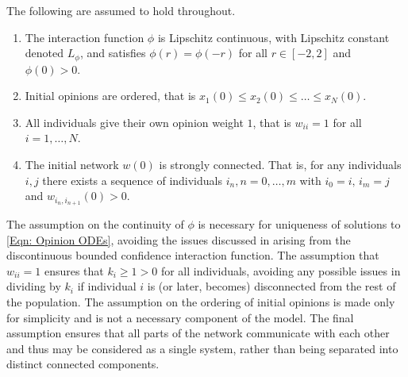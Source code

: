 \documentclass{article}
\begin{document}
\begin{assumption} \label{Assumption group: standard}
    The following are assumed to hold throughout. 
    \begin{enumerate}[label=\alph*)]
        \item The interaction function $\phi$ is Lipschitz continuous, with Lipschitz constant denoted $L_\phi$, and satisfies $\phi(r) = \phi(-r)$ for all $r\in[-2,2]$ and $\phi(0)>0$. \label{Assumptions on phi}
        \item Initial opinions are ordered, that is $x_1(0)\leq x_2(0) \leq\dots\leq x_N(0)$. \label{Assumptions on x0}
        \item All individuals give their own opinion weight $1$, that is $w_{ii}=1$ for all $i=1,\dots,N$. \label{Assumptions on w}
        \item The initial network $w(0)$ is strongly connected. That is, for any individuals $i,j$ there exists a sequence of individuals $i_n, n=0,\dots,m$ with $i_0=i, \, i_m=j$ and $w_{i_n,i_{n+1}}(0)>0$.
    \end{enumerate} 
\end{assumption}

The assumption on the continuity of $\phi$ is necessary for uniqueness of solutions to \eqref{Eqn: Opinion ODEs}, avoiding the issues discussed in \cite{blondel_continuous-time_2009} arising from the discontinuous bounded confidence interaction function. The assumption that $w_{ii}=1$ ensures that $k_i\geq1>0$ for all individuals, avoiding any possible issues in dividing by $k_i$ if individual $i$ is (or later, becomes) disconnected from the rest of the population. The assumption on the ordering of initial opinions is made only for simplicity and is not a necessary component of the model. The final assumption ensures that all parts of the network communicate with each other and thus may be considered as a single system, rather than being separated into distinct connected components. 
\end{document}
